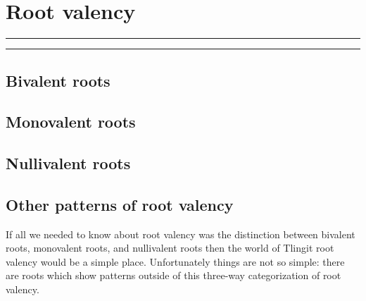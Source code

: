 
\resetexcnt
\chapter{Root valency}\label{ch:rootval}

\startcontents[chapters]
\noindent\rule[0.5em]{\textwidth}{\heavyrulewidth}
\noindent\rule{\textwidth}{\heavyrulewidth}
\vspace{1\baselineskip}


\section{Bivalent roots}\label{sec:rootval-bi}

\section{Monovalent roots}\label{sec:rootval-mono}

\section{Nullivalent roots}\label{sec:rootval-null}

\section{Other patterns of root valency}\label{sec:rootval-other}

If all we needed to know about root valency was the distinction between bivalent roots, monovalent roots, and nullivalent roots then the world of Tlingit root valency would be a simple place.
Unfortunately things are not so simple: there are roots which show patterns outside of this three-way categorization of root valency.

\stopcontents[chapters]